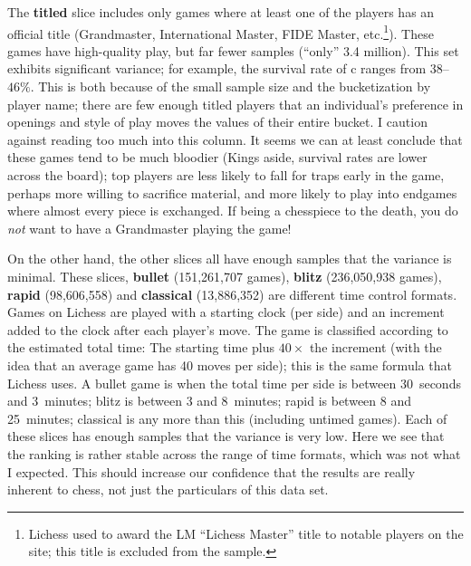 \documentclass[twocolumn]{article}
\begin{document}
The {\bf titled} slice includes only games where at least one of the
players has an official title (Grandmaster, International Master, FIDE
Master, etc.\footnote{Lichess used to award the LM ``Lichess Master''
  title to notable players on the site; this title is excluded from
  the sample.}). These games have high-quality play, but far fewer
samples (``only'' 3.4 million). This set exhibits significant
variance; for example, the survival rate of \pawn c ranges from
$38$--$46\%$. This is both because of the small sample size and the
bucketization by player name; there are few enough titled players that
an individual's preference in openings and style of play moves the
values of their entire bucket. I caution against reading too much into
this column. It seems we can at least conclude that these games tend
to be much bloodier (Kings aside, survival rates are lower across the
board); top players are less likely to fall for traps early in the
game, perhaps more willing to sacrifice material, and more likely to
play into endgames where almost every piece is exchanged. If being a
chesspiece to the death, you do {\em not} want to have a Grandmaster
playing the game!


On the other hand, the other slices all have enough samples that the
variance is minimal. These slices, {\bf bullet} (151,261,707 games),
{\bf blitz} (236,050,938 games), {\bf rapid} (98,606,558) and {\bf
  classical} (13,886,352) are different time control formats. Games on
Lichess are played with a starting clock (per side) and an increment
added to the clock after each player's move. The game is classified
according to the estimated total time: The starting time plus $40 \times$
the increment (with the idea that an average game has 40 moves per
side); this is the same formula that Lichess uses. A bullet game is
when the total time per side is between 30~seconds and 3~minutes;
blitz is between 3 and 8~minutes; rapid is between 8 and 25~minutes;
classical is any more than this (including untimed games). Each of
these slices has enough samples that the variance is very low.
Here we see that the ranking is rather stable across the range of
time formats, which was not what I expected. This should increase
our confidence that the results are really inherent to chess, not
just the particulars of this data set.



{}

\end{document}
